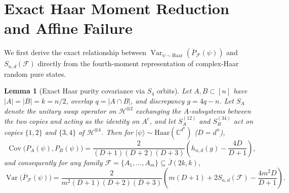 \documentclass[11pt,reqno]{amsart}
\newtheorem{lemma}[theorem]{Lemma}
\theoremstyle{definition}
\theoremstyle{remark}
\newcommand{\Var}{\operatorname{Var}}
\newcommand{\Cov}{\operatorname{Cov}}
\newcommand{\Jbar}{\overline{J}}
\newcommand{\F}{\mathcal{F}}
\begin{document}
\section{Exact Haar Moment Reduction and Affine Failure}\label{sec:moment}

We first derive the exact relationship between $\Var_{\psi \sim \mathrm{Haar}}(\overline{P}_{\F}(\psi))$ and $S_{n,d}(\F)$ directly from the fourth-moment representation of complex-Haar random pure states.

\begin{lemma}[Exact Haar purity covariance via $S_4$ orbits]\label{lem:haar_cov}
Let $A, B \subset [n]$ have $|A|=|B|=k=n/2$, overlap $q = |A\cap B|$, and discrepancy $g = 4q - n$. Let $S_A$ denote the unitary swap operator on $\mathcal{H}^{\otimes 2}$ exchanging the $A$-subsystems between the two copies and acting as the identity on $A^c$, and let $S_A^{(12)}$ and $S_B^{(34)}$ act on copies $\{1,2\}$ and $\{3,4\}$ of $\mathcal{H}^{\otimes 4}$. Then for $|\psi\rangle \sim \mathrm{Haar}(\mathbb{C}^{d^n})$ ($D = d^n$),
\begin{equation}\label{eq:cov_exact}
\Cov\!\big(P_A(\psi), P_B(\psi)\big) = \frac{2}{(D+1)(D+2)(D+3)}\!\left(h_{n,d}(g) - \frac{4D}{D+1}\right),
\end{equation}
and consequently for any family $\F = \{A_1,\dots,A_m\} \subseteq \Jbar(2k,k)$,
\begin{equation}\label{eq:var_exact}
\Var\!\big(\overline{P}_{\F}(\psi)\big) = \frac{2}{m^2(D+1)(D+2)(D+3)}\!\left(m(D+1) + 2 S_{n,d}(\F) - \frac{4 m^2 D}{D+1}\right).
\end{equation}
\end{lemma}
\end{document}
